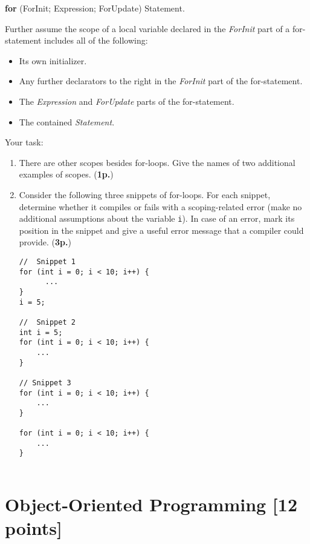 \documentclass{article}
\begin{document}
\begin{enumerate}
\begin{center}
  \textbf{for} (ForInit; Expression; ForUpdate) Statement.
\end{center}
Further assume the  scope of a local variable declared in the 
\textit{ForInit} part of a 
for-statement includes all of the following:
\begin{itemize}
    \item Its own initializer.
    \item Any further declarators to the right in the \textit{ForInit} 
          part of the for-statement.
    \item The \textit{Expression} and \textit{ForUpdate} parts of the 
          for-statement.
    \item The contained \textit{Statement}. 
\end{itemize}

Your task:
\begin{enumerate}
\item There are other scopes besides for-loops. Give the names of two
additional examples of scopes. 
(\textbf{1p.})
\item Consider the following three snippets of for-loops. For each snippet, 
determine whether it compiles or fails with a scoping-related error
(make no additional assumptions about the variable \texttt{i}). In case
of an error, mark its position in the snippet and give a useful error message
that a compiler could provide. (\textbf{3p.})
{\small
\begin{verbatim}
//  Snippet 1
for (int i = 0; i < 10; i++) {
      ... 
}
i = 5;      

//  Snippet 2 
int i = 5;
for (int i = 0; i < 10; i++) {   
    ...
}
    
// Snippet 3
for (int i = 0; i < 10; i++) {
    ...
}

for (int i = 0; i < 10; i++) { 
    ...
}
    
\end{verbatim}
}


\end{enumerate}
\end{enumerate}

\newpage
\section{Object-Oriented Programming [12 points]}
\end{document}
